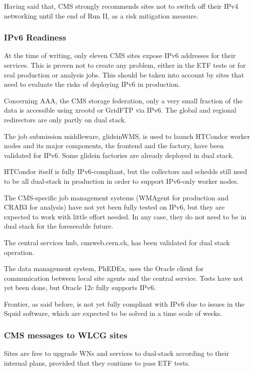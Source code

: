 \documentclass[11pt]{article}
\begin{document}
Having said that, CMS strongly recommends sites not to switch off
their IPv4 networking until the end of Run II, as a risk mitigation
measure.

\subsubsection{IPv6 Readiness}
At the time of writing, only eleven CMS sites expose IPv6 addresses
for their services. This is proven not to create any problem, either
in the ETF tests or for real production or analysis jobs. This should
be taken into account by sites that need to evaluate the risks of
deploying IPv6 in production.

Concerning AAA, the CMS storage federation, only a very small fraction
of the data is accessible using xrootd or GridFTP via IPv6. The global
and regional redirectors are only partly on dual stack.

The job submission middleware, glideinWMS, is used to launch HTCondor
worker nodes and its major components, the frontend and the factory,
have been validated for IPv6. Some glidein factories are already
deployed in dual stack.

HTCondor itself is fully IPv6-compliant, but the collectors and
schedds still need to be all dual-stack in production in order to
support IPv6-only worker nodes.

The CMS-specific job management systems (WMAgent for production and
CRAB3 for analysis) have not yet been fully tested on IPv6, but they
are expected to work with little effort needed. In any case, they do
not need to be in dual stack for the foreseeable future.

The central services hub, cmsweb.cern.ch, has been validated for dual
stack operation.

The data management system, PhEDEx, uses the Oracle client for
communication between local site agents and the central service. Tests
have not yet been done, but Oracle 12c fully supports IPv6.

Frontier, as said before, is not yet fully compliant with IPv6 due to
issues in the Squid software, which are expected to be solved in a
time scale of weeks.

\subsubsection{CMS messages to WLCG sites}
Sites are free to upgrade WNs and services to dual-stack according to
their internal plans, provided that they continue to pass ETF tests.
\end{document}

